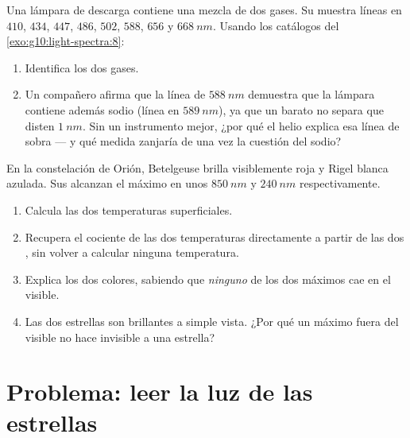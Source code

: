 \begin{exercise}[$\star\star\star$]\label{exo:g10:light-spectra:14}
Una lámpara de descarga contiene una mezcla de dos gases. Su 
muestra líneas en $410$, $434$, $447$, $486$, $502$, $588$, $656$ y
$\qty{668}{nm}$. Usando los catálogos del
\cref{exo:g10:light-spectra:8}:
\begin{enumerate}
  \item Identifica los dos gases.
  \item Un compañero afirma que la línea de $\qty{588}{nm}$ demuestra
        que la lámpara contiene además sodio (línea en $\qty{589}{nm}$),
        ya que un  barato no separa  que
        disten $\qty{1}{nm}$. Sin un instrumento mejor, ¿por qué el
        helio explica esa línea de sobra --- y qué medida zanjaría de
        una vez la cuestión del sodio?
\end{enumerate}
\end{exercise}

\begin{exercise}[$\star\star\star$]\label{exo:g10:light-spectra:15}
En la constelación de Orión, Betelgeuse brilla visiblemente roja y Rigel
blanca azulada. Sus  alcanzan el máximo en unos
$\qty{850}{nm}$ y $\qty{240}{nm}$ respectivamente.
\begin{enumerate}
  \item Calcula las dos temperaturas superficiales.
  \item Recupera el cociente de las dos temperaturas directamente a
        partir de las dos , sin volver a calcular
        ninguna temperatura.
  \item Explica los dos colores, sabiendo que \emph{ninguno} de los dos
        máximos cae en el visible.
  \item Las dos estrellas son brillantes a simple vista. ¿Por qué un
        máximo fuera del visible no hace invisible a una estrella?
\end{enumerate}
\end{exercise}

\section{Problema: leer la luz de las estrellas}


